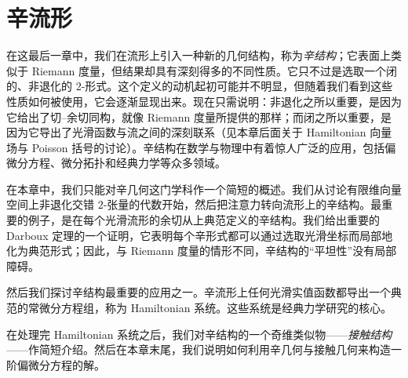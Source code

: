 \documentclass[../main.tex]{subfiles}
\begin{document}
\chapter{辛流形}\label{chapter:ch22-symplectic-manifolds}

在这最后一章中，我们在流形上引入一种新的几何结构，称为\emph{辛结构}；它表面上类似于 Riemann 度量，但结果却具有深刻得多的不同性质。它只不过是选取一个闭的、非退化的 $2$-形式。这个定义的动机起初可能并不明显，但随着我们看到这些性质如何被使用，它会逐渐显现出来。现在只需说明：非退化之所以重要，是因为它给出了切--余切同构，就像 Riemann 度量所提供的那样；而闭之所以重要，是因为它导出了光滑函数与流之间的深刻联系（见本章后面关于 Hamiltonian 向量场与 Poisson 括号的讨论）。辛结构在数学与物理中有着惊人广泛的应用，包括偏微分方程、微分拓扑和经典力学等众多领域。

在本章中，我们只能对辛几何这门学科作一个简短的概述。我们从讨论有限维向量空间上非退化交错 $2$-张量的代数开始，然后把注意力转向流形上的辛结构。最重要的例子，是在每个光滑流形的余切从上典范定义的辛结构。我们给出重要的 Darboux 定理的一个证明，它表明每个辛形式都可以通过选取光滑坐标而局部地化为典范形式；因此，与 Riemann 度量的情形不同，辛结构的“平坦性”没有局部障碍。

然后我们探讨辛结构最重要的应用之一。辛流形上任何光滑实值函数都导出一个典范的常微分方程组，称为 Hamiltonian 系统。这些系统是经典力学研究的核心。

在处理完 Hamiltonian 系统之后，我们对辛结构的一个奇维类似物——\emph{接触结构}——作简短介绍。然后在本章末尾，我们说明如何利用辛几何与接触几何来构造一阶偏微分方程的解。








\end{document}
